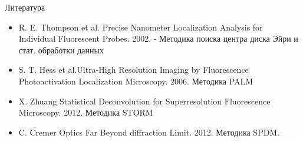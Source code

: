 \documentclass[9pt, compress, xcolor=table]{beamer}
\begin{document}
\begin{frame}{Литература}

\begin{itemize}
\item R. E. Thompson et al. Precise Nanometer Localization Analysis for Individual Fluorescent Probes. 2002. - Методика поиска центра диска Эйри и стат. обработки данных
\item S. T. Hess et al.Ultra-High Resolution Imaging by Fluorescence Photoactivation Localization Microscopy. 2006. Методика PALM
\item X. Zhuang Statistical Deconvolution for Superresolution Fluorescence Microscopy. 2012. Методика STORM
\item C. Cremer Optics Far Beyond diffraction Limit. 2012. Методика SPDM.
\end{itemize}

\end{frame}
\end{document}
